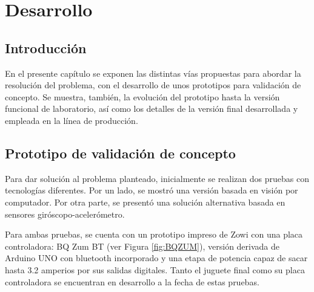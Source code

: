 

\chapter{Desarrollo} %

\label{Chapter3} %


\section{Introducción}

En el presente capítulo se exponen las distintas vías propuestas para abordar la resolución del problema, con el desarrollo de unos prototipos para validación de concepto. Se muestra, también, la evolución del prototipo hasta la versión funcional de laboratorio, así como los detalles de la versión final desarrollada y empleada en la línea de producción.


\section{Prototipo de validación de concepto}

Para dar solución al problema planteado, inicialmente se realizan dos pruebas con tecnologías diferentes. Por un lado, se mostró una versión basada en visión por computador. Por otra parte, se presentó una solución alternativa basada en sensores giróscopo-acelerómetro.

Para ambas pruebas, se cuenta con un prototipo impreso de Zowi con una placa controladora: BQ Zum BT (ver Figura \ref{fig:BQZUM}), versión derivada de Arduino UNO con bluetooth incorporado y una etapa de potencia capaz de sacar hasta 3.2 amperios por sus salidas digitales. Tanto el juguete final como su placa controladora se encuentran en desarrollo a la fecha de estas pruebas.

